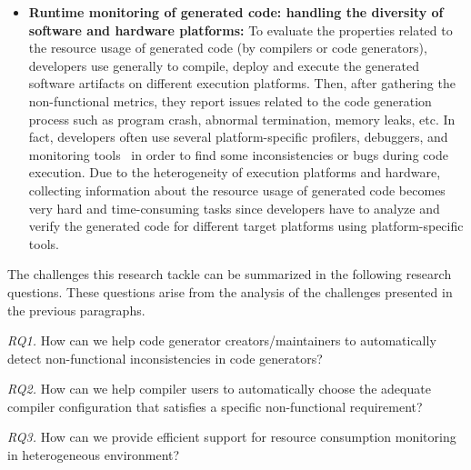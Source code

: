 \begin{itemize}
\item
\textbf{Runtime monitoring of generated code: handling the diversity of software and hardware platforms:} To evaluate the properties related to the resource usage of generated code (by compilers or code generators), developers use generally to compile, deploy and execute the generated software artifacts on different execution platforms. Then, after gathering the non-functional metrics, they report issues related to the code generation process such as program crash, abnormal termination, memory leaks, etc.
In fact, developers often use several platform-specific profilers, debuggers, and monitoring tools~\cite{guana2014chaintracker,delgado2004taxonomy} in order to find some inconsistencies or bugs during code execution. 
Due to the heterogeneity of execution platforms and hardware, collecting information about the resource usage of generated code becomes very hard and time-consuming tasks since developers have to analyze and verify the generated code for different target platforms using platform-specific tools. 


\end{itemize}
The challenges this research tackle can be summarized in the following research questions. These questions arise from the analysis of the challenges presented in the previous paragraphs.

\textit{RQ1.} How can we help code generator creators/maintainers to automatically detect non-functional inconsistencies in code generators?

\textit{RQ2.} How can we help compiler users to automatically choose the adequate compiler configuration that satisfies a specific non-functional requirement?

\textit{RQ3.} How can we provide efficient support for resource consumption monitoring in heterogeneous environment?


